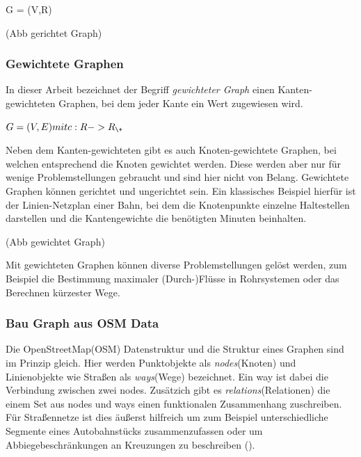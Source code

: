 \documentclass[10pt,a4paper]{article}
\begin{document}
G = (V,R)

(Abb gerichtet Graph)

\subsubsection{Gewichtete Graphen}
In dieser Arbeit bezeichnet der Begriff \textit{gewichteter Graph} einen Kanten-gewichteten Graphen, bei dem jeder Kante ein Wert zugewiesen wird.

$G = (V,E) mit c: R -> R_{\+}$

Neben dem Kanten-gewichteten gibt es auch Knoten-gewichtete Graphen, bei welchen entsprechend die Knoten gewichtet werden. Diese werden aber nur für wenige Problemstellungen gebraucht und sind hier nicht von Belang. Gewichtete Graphen können gerichtet und ungerichtet sein. Ein klassisches Beispiel hierfür ist der Linien-Netzplan einer Bahn, bei dem die Knotenpunkte einzelne Haltestellen darstellen und die Kantengewichte die benötigten Minuten beinhalten.

(Abb gewichtet Graph)

Mit gewichteten Graphen können diverse Problemstellungen gelöst werden, zum Beispiel die Bestimmung maximaler (Durch-)Flüsse in Rohrsystemen oder das Berechnen kürzester Wege.

\subsubsection{Bau Graph aus OSM Data}

Die OpenStreetMap(OSM) Datenstruktur und die Struktur eines Graphen sind im Prinzip gleich. Hier werden Punktobjekte als \textit{nodes}(Knoten) und Linienobjekte wie Straßen als \textit{ways}(Wege) bezeichnet. Ein way ist dabei die Verbindung zwischen zwei nodes. Zusätzich gibt es \textit{relations}(Relationen) die einem Set aus nodes und ways einen funktionalen Zusammenhang zuschreiben. Für Straßennetze ist dies äußerst hilfreich um zum Beispiel unterschiedliche Segmente eines Autobahnstücks zusammenzufassen oder um Abbiegebeschränkungen an Kreuzungen zu beschreiben (\cite{osmrelation}).
\end{document}
